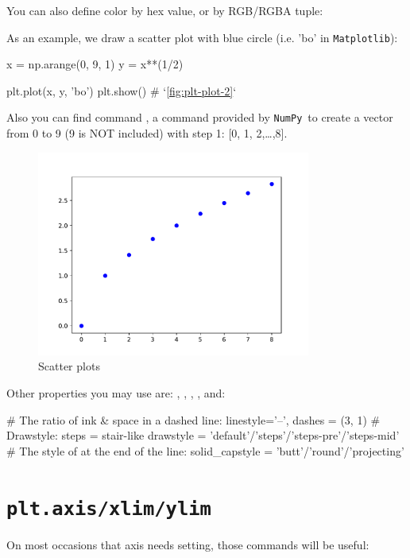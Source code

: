 \documentclass{report}
\newcommand{\pkg}[1]{\texttt{#1}}
\newcommand{\NumPy}{\pkg{NumPy}}
\newcommand{\mpl}{\texttt{Matplotlib}}
\begin{document}
You can also define color by hex value, or by RGB/RGBA tuple:

As an example, we draw a scatter plot with blue circle (i.e. 'bo' in \mpl):
\begin{py}
x = np.arange(0, 9, 1)
y = x**(1/2)

plt.plot(x, y, 'bo')
plt.show() # `\autoref{fig:plt-plot-2}`
\end{py}

Also you can find command , a command provided by \NumPy\ to create a vector from 0 to 9 (9 is NOT included) with step 1: [0, 1, 2,\ldots ,8]. 

\begin{figure}[!htb]
  \centering
  \includegraphics[width=90mm]{plt-plot-2}
  \caption{Scatter plots}
  \label{fig:plt-plot-2}
\end{figure}

Other properties you may use are: , , , , and:
\begin{py}
# The ratio of ink & space in a dashed line:
linestyle='--', dashes = (3, 1)
# Drawstyle: steps = stair-like
drawstyle = 'default'/'steps'/'steps-pre'/'steps-mid'
# The style of at the end of the line: 
solid_capstyle = 'butt'/'round'/'projecting'
\end{py} 

\section{\texttt{plt.axis/xlim/ylim}}
On most occasions that axis needs setting, those commands will be useful:
\end{document}
